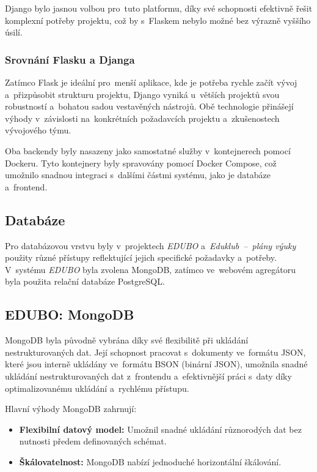 \documentclass[male,czech,api_bc]{kitheses}
\begin{document}
Django bylo jasnou volbou pro~tuto platformu, díky své schopnosti efektivně řešit komplexní potřeby projektu, což by s~Flaskem nebylo možné bez výrazně vyššího úsilí.

\subsubsection{Srovnání Flasku a Djanga}

Zatímco Flask je ideální pro~menší aplikace, kde je potřeba rychle začít vývoj a~přizpůsobit strukturu projektu, Django vyniká u~větších projektů svou robustností a~bohatou sadou vestavěných nástrojů. Obě technologie přinášejí výhody v~závislosti na~konkrétních požadavcích projektu a~zkušenostech vývojového týmu.

Oba backendy byly nasazeny jako samostatné služby v~kontejnerech pomocí Dockeru. Tyto kontejnery byly spravovány pomocí Docker Compose, což umožnilo snadnou integraci s~dalšími částmi systému, jako je databáze a~frontend.

\subsection{Databáze}

Pro databázovou vrstvu byly v~projektech \textit{EDUBO} a~\textit{Eduklub~--~plány výuky} použity různé přístupy reflektující jejich specifické požadavky a~potřeby. V~systému \textit{EDUBO} byla zvolena MongoDB, zatímco ve~webovém agregátoru byla použita relační databáze PostgreSQL.

\subsection{EDUBO: MongoDB}

MongoDB byla původně vybrána díky své flexibilitě při ukládání nestrukturovaných dat. Její schopnost pracovat s~dokumenty ve~formátu JSON, které jsou interně ukládány ve~formátu BSON (binární JSON), umožnila snadné ukládání nestrukturovaných dat z~frontendu a~efektivnější práci s~daty díky optimalizovanému ukládání a~rychlému přístupu.

Hlavní výhody MongoDB zahrnují:
\begin{itemize}
	\item \textbf{Flexibilní datový model:} Umožnil snadné ukládání různorodých dat bez nutnosti předem definovaných schémat.
	\item \textbf{Škálovatelnost:} MongoDB nabízí jednoduché horizontální škálování.
\end{itemize}
\end{document}
